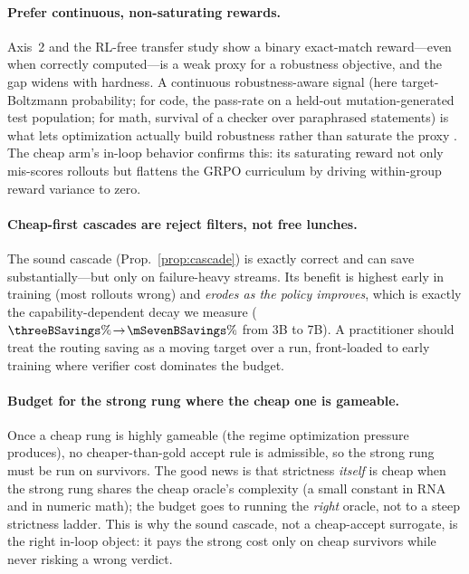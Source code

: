 \paragraph{Prefer continuous, non-saturating rewards.} Axis~2 and the RL-free transfer study show a binary
exact-match reward---even when correctly computed---is a weak proxy for a robustness objective, and the gap
widens with hardness. A continuous robustness-aware signal (here target-Boltzmann probability; for code, the
pass-rate on a held-out mutation-generated test population; for math, survival of a checker over paraphrased
statements) is what lets optimization actually build robustness rather than saturate the proxy
\citep{gao2023overoptimization}. The cheap arm's in-loop behavior confirms this: its saturating reward not
only mis-scores rollouts but flattens the GRPO curriculum by driving within-group reward variance to zero.

\paragraph{Cheap-first cascades are reject filters, not free lunches.} The sound cascade
(Prop.~\ref{prop:cascade}) is exactly correct and can save substantially---but only on failure-heavy streams.
Its benefit is highest early in training (most rollouts wrong) and \emph{erodes as the policy improves}, which
is exactly the capability-dependent decay we measure ($\threeBSavings\%\!\to\!\mSevenBSavings\%$ from 3B to
7B). A practitioner should treat the routing saving as a moving target over a run, front-loaded to early
training where verifier cost dominates the budget.

\paragraph{Budget for the strong rung where the cheap one is gameable.} Once a cheap rung is highly gameable
(the regime optimization pressure produces), no cheaper-than-gold accept rule is admissible, so the strong
rung must be run on survivors. The good news is that strictness \emph{itself} is cheap when the strong rung
shares the cheap oracle's complexity (a small constant in RNA and in numeric math); the budget goes to running
the \emph{right} oracle, not to a steep strictness ladder. This is why the sound cascade, not a cheap-accept
surrogate, is the right in-loop object: it pays the strong cost only on cheap survivors while never risking a
wrong verdict.

